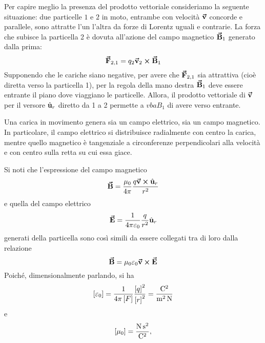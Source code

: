 \begin{example}
	Per capire meglio la presenza del prodotto vettoriale consideriamo la seguente situazione: due particelle $1$ e $2$ in moto, entrambe con velocità $\vb*{\va{v}}$ concorde e parallele, sono attratte l'un l'altra da forze di Lorentz  uguali e contrarie. La forza che subisce la particella 2 è dovuta all'azione del campo magnetico $\vb*{\va{B}}_1$ generato dalla prima:
	\begin{equation*}
		\vb*{\va{F}}_{2,1}=q_2\vb*{\va{v}}_2\cross\vb*{\va{B}}_1
	\end{equation*}
	Supponendo che le cariche siano negative, per avere che $\vb*{\va{F}}_{2,1}$ sia attrattiva (cioè diretta verso la particella 1), per la regola della mano destra $\vb*{\va{B}}_1$ deve essere entrante il piano dove viaggiano le particelle. Allora, il prodotto vettoriale di $\vb*{\va{v}}$ per il versore $\hat{\mathbf{u}}_r$ diretto da 1 a 2 permette a $vba{B}_1$ di avere verso entrante.
\end{example}
\begin{observe}
	Una carica in movimento genera sia un campo elettrico, sia un campo magnetico. In particolare, il campo elettrico si distribuisce radialmente con centro la carica, mentre quello magnetico è tangenziale a circonferenze perpendicolari alla velocità e con centro sulla retta su cui essa giace.
\end{observe}
Si noti che l'espressione del campo magnetico
\begin{equation}
	\vb*{\va{B}}=\frac{\mu_0}{4\pi}\frac{q\vb*{\va{v}}\cross\hat{\mathbf{u}}_r}{r^2}
\end{equation}
e quella del campo elettrico
\begin{equation}
	\vb*{\va{E}}=\frac{1}{4\pi\varepsilon_0}\frac{q}{r^2}\hat{\mathbf{u}}_r
\end{equation}
generati della particella sono così simili da essere collegati tra di loro dalla relazione
\begin{equation}
	\vb*{\va{B}}=\mu_0\varepsilon_0\vb*{\va{v}}\cross\vb*{\va{E}}
\end{equation}
Poiché, dimensionalmente parlando, si ha
\begin{equation*}
	\left[\epsilon_0\right]=\frac{1}{4\pi\left[F\right]}\frac{\left[q\right]^2}{\left[r\right]^2}=\unit[per-mode = fraction]{\coulomb\squared\per\meter\squared\per\newton}
\end{equation*}
e
\begin{equation*}
	\left[\mu_0\right]=\unit[per-mode = fraction]{\newton\second\squared\per\coulomb\squared},
\end{equation*}
